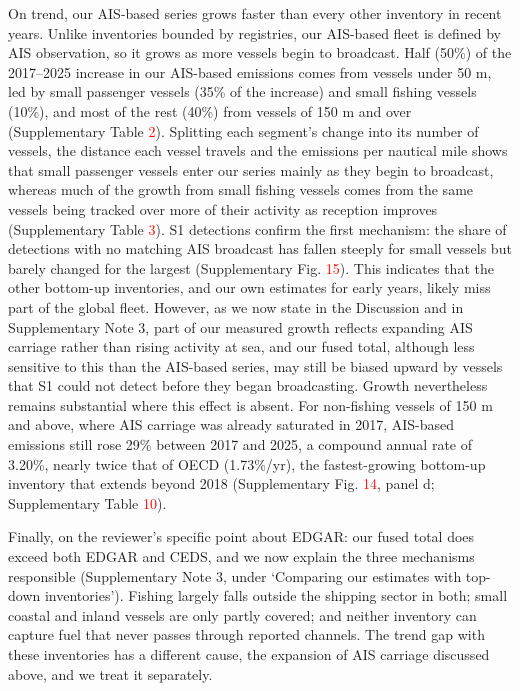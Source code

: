 \documentclass[11pt]{article}
\begin{document}
On trend, our AIS-based series grows faster than every other inventory in recent years. Unlike inventories bounded by registries, our AIS-based fleet is defined by AIS observation, so it grows as more vessels begin to broadcast. Half (50\%) of the 2017--2025 increase in our AIS-based emissions comes from vessels under 50 m, led by small passenger vessels (35\% of the increase) and small fishing vessels (10\%), and most of the rest (40\%) from vessels of 150 m and over (Supplementary Table \textcolor{red}{2}). Splitting each segment's change into its number of vessels, the distance each vessel travels and the emissions per nautical mile shows that small passenger vessels enter our series mainly as they begin to broadcast, whereas much of the growth from small fishing vessels comes from the same vessels being tracked over more of their activity as reception improves (Supplementary Table \textcolor{red}{3}). S1 detections confirm the first mechanism: the share of detections with no matching AIS broadcast has fallen steeply for small vessels but barely changed for the largest (Supplementary Fig. \textcolor{red}{15}). This indicates that the other bottom-up inventories, and our own estimates for early years, likely miss part of the global fleet. However, as we now state in the Discussion and in Supplementary Note 3, part of our measured growth reflects expanding AIS carriage rather than rising activity at sea, and our fused total, although less sensitive to this than the AIS-based series, may still be biased upward by vessels that S1 could not detect before they began broadcasting. Growth nevertheless remains substantial where this effect is absent. For non-fishing vessels of 150 m and above, where AIS carriage was already saturated in 2017, AIS-based emissions still rose 29\% between 2017 and 2025, a compound annual rate of 3.20\%, nearly twice that of OECD (1.73\%/yr), the fastest-growing bottom-up inventory that extends beyond 2018 (Supplementary Fig. \textcolor{red}{14}, panel d; Supplementary Table \textcolor{red}{10}).

Finally, on the reviewer's specific point about EDGAR: our fused total does exceed both EDGAR and CEDS, and we now explain the three mechanisms responsible (Supplementary Note 3, under `Comparing our estimates with top-down inventories'). Fishing largely falls outside the shipping sector in both; small coastal and inland vessels are only partly covered; and neither inventory can capture fuel that never passes through reported channels. The trend gap with these inventories has a different cause, the expansion of AIS carriage discussed above, and we treat it separately.
\end{document}
